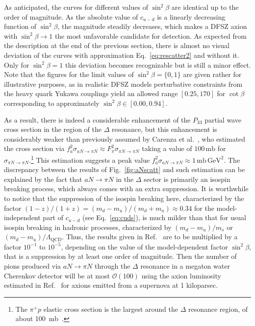 \documentclass[reprint,amssymb,amsmath,floatfix,aps,prd,groupedaddress,nofootinbib]{revtex4-2}
\begin{document}
As anticipated, the curves for different values of $\sin^2\beta$ are identical up to the order of magnitude.
As the absolute value of $c_{u-d}$ is a linearly decreasing function of $\sin^2\beta$, the magnitude
steadily decreases, which makes a DFSZ axion with $\sin^2\beta\to 1$ the most unfavorable candidate for
detection. As expected from the description at the end of the previous section, there is almost no
visual deviation of the curves with approximation Eq.~\eqref{eq:rescatter2} and without it. Only
for $\sin^2\beta=1$ this deviation becomes recognizable but is still a minor effect. Note that the figures for the limit values of $\sin^2\beta = \{0,1\}$ are given rather for illustrative purposes, as in realistic DFSZ models perturbative constraints from the heavy quark Yukawa couplings yield an allowed range $[0.25,170]$ for $\cot\beta$ \cite{DiLuzio:2020wdo} corresponding to approximately $\sin^2\beta\in [0.00,0.94]$.

As a result, there is indeed a considerable enhancement of the $P_{33}$ partial wave cross section in the region of
the $\Delta$ resonance, but this enhancement is considerably weaker than previously assumed by Carenza et
al.~\cite{Carenza:2020cis}, who estimated the cross section via $f_a^2 \sigma_{aN\to\pi N} \approx
F_\pi^2 \sigma_{\pi N\to \pi N}$ taking a value of $100\,\mathrm{mb}$ for $\sigma_{\pi N\to \pi N}$.\footnote{The $\pi^+p$ elastic cross section is the largest around the $\Delta$ resonance region, of about 100~mb~\cite{ParticleDataGroup:2020ssz}.} This
estimation suggests a peak value $f_a^2 \sigma_{aN\to\pi N} \approx 1\,\mathrm{mb}\,\mathrm{GeV}^2$.
The discrepancy between the results of Fig.~\ref{fig:aNscatt} and such estimation can be
explained by the fact that ${aN\to\pi N}$ in the $\Delta$ sector is primarily an isospin breaking process,
which always comes with an extra suppression. It is worthwhile to notice that the suppression of the isospin breaking here, characterized by the factor $(1-z)/(1+z) = (m_d-m_u)/(m_d+m_u) \approx 0.34$ for the model-independent part of $c_{u-d}$ (see Eq.~\eqref{eq:cuds}), is much milder than that for usual isospin breaking in hadronic processes, characterized by $(m_d-m_u)/m_s$ or $(m_d-m_u)/\Lambda_\text{QCD}$. Thus, the results given in Ref.~\cite{Carenza:2020cis} are
to be multiplied by a factor $10^{-1}$ to $10^{-5}$, depending on the value of the model-dependent factor $\sin^2\beta$, that is a suppression by at least one order of magnitude.
Then the number of pions produced via $aN\to \pi N$  through the $\Delta$ resonance in a megaton water Cherenkov detector will be at most $\mathcal{O}(100)$ using the axion luminosity estimated in Ref.~\cite{Carenza:2020cis} for axions emitted from a supernova at 1 kiloparsec.
\end{document}
